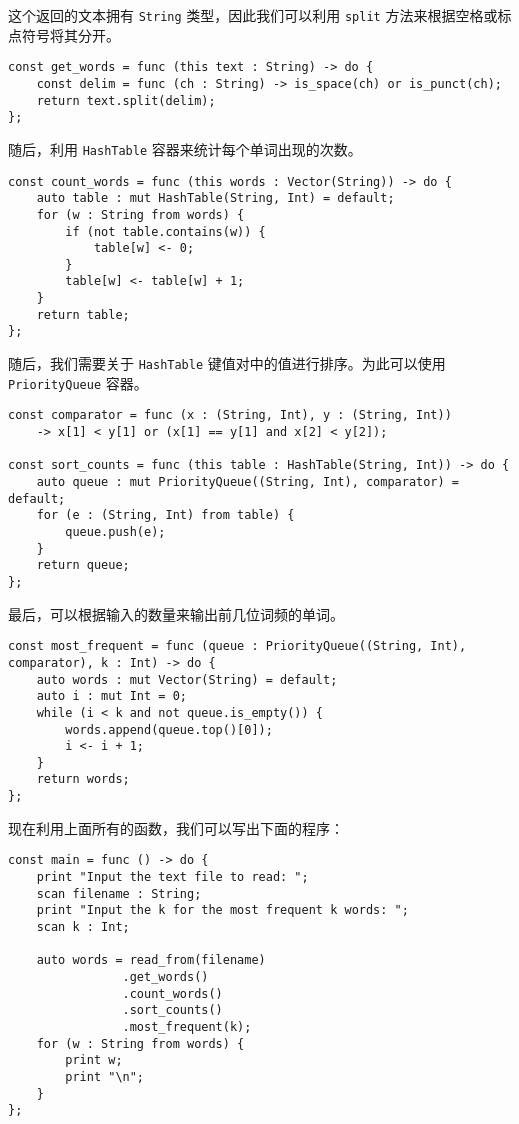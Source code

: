 这个返回的文本拥有 \lstinline!String! 类型，因此我们可以利用 \lstinline!split! 方法来根据空格或标点符号将其分开。

\begin{lstlisting}
const get_words = func (this text : String) -> do {
    const delim = func (ch : String) -> is_space(ch) or is_punct(ch);
    return text.split(delim);
};
\end{lstlisting}

随后，利用 \lstinline!HashTable! 容器来统计每个单词出现的次数。

\begin{lstlisting}
const count_words = func (this words : Vector(String)) -> do {
    auto table : mut HashTable(String, Int) = default;
    for (w : String from words) {
        if (not table.contains(w)) {
            table[w] <- 0;
        }
        table[w] <- table[w] + 1;
    }
    return table;
};
\end{lstlisting}

随后，我们需要关于 \lstinline!HashTable! 键值对中的值进行排序。为此可以使用 \lstinline!PriorityQueue! 容器。

\begin{lstlisting}
const comparator = func (x : (String, Int), y : (String, Int)) 
    -> x[1] < y[1] or (x[1] == y[1] and x[2] < y[2]);

const sort_counts = func (this table : HashTable(String, Int)) -> do {
    auto queue : mut PriorityQueue((String, Int), comparator) = default;
    for (e : (String, Int) from table) {
        queue.push(e);
    }
    return queue;
};
\end{lstlisting}

最后，可以根据输入的数量来输出前几位词频的单词。

\begin{lstlisting}
const most_frequent = func (queue : PriorityQueue((String, Int), comparator), k : Int) -> do {
    auto words : mut Vector(String) = default;
    auto i : mut Int = 0;
    while (i < k and not queue.is_empty()) {
        words.append(queue.top()[0]);
        i <- i + 1;
    }
    return words;
};
\end{lstlisting}

现在利用上面所有的函数，我们可以写出下面的程序：

\begin{lstlisting}
const main = func () -> do {
    print "Input the text file to read: ";
    scan filename : String;
    print "Input the k for the most frequent k words: ";
    scan k : Int;

    auto words = read_from(filename)
                .get_words()
                .count_words()
                .sort_counts()
                .most_frequent(k);
    for (w : String from words) {
        print w;
        print "\n";
    }
};
\end{lstlisting}